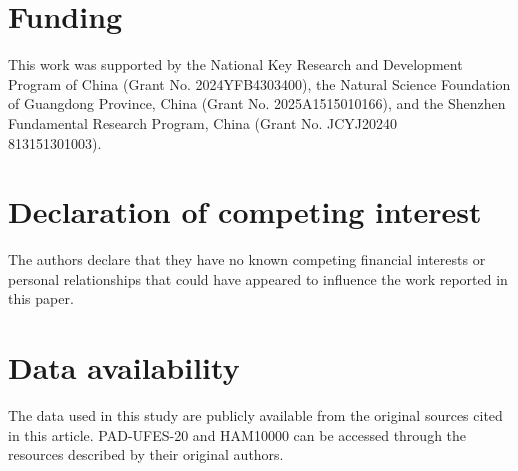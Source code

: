 \documentclass[preprint,12pt]{elsarticle}
\makeatletter
\def@NAT@last@yr{--\NAT@penalty}%
\makeatother
\begin{document}
\section*{Funding}

This work was supported by the National Key Research and Development Program of China (Grant No. 2024YFB4303400), the Natural Science Foundation of Guangdong Province, China (Grant No. 2025A1515010166), and the Shenzhen Fundamental Research Program, China (Grant No. JCYJ20240\\
813151301003).

\section*{Declaration of competing interest}
The authors declare that they have no known competing financial interests or personal relationships that could have appeared to influence the work reported in this paper.

\section*{Data availability}
The data used in this study are publicly available from the original sources cited in this article. PAD-UFES-20 and HAM10000 can be accessed through the resources described by their original authors.




\end{document}
